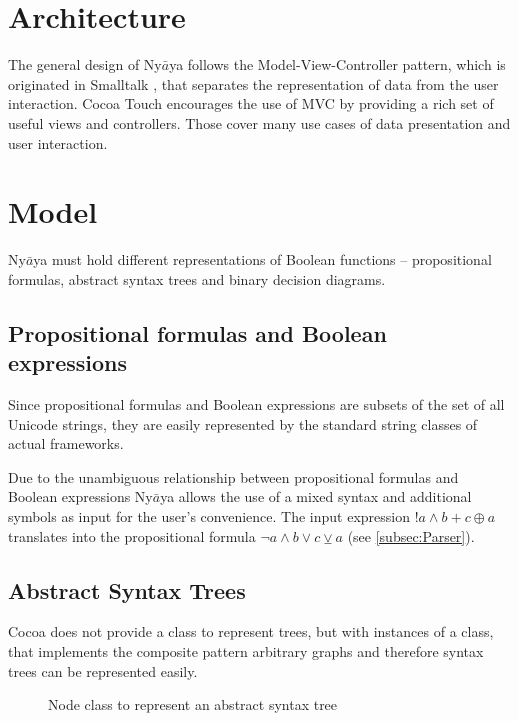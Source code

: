 
\section{Architecture}

The general design of Ny$\bar{a}$ya follows the Model-View-Controller pattern,
which is originated in Smalltalk \cite[p.4]{GAMMAETAL}, 
that separates the representation of data from the user interaction.
Cocoa Touch  encourages the use of MVC by providing a rich set of useful views and controllers.
Those cover many use cases of data presentation and user interaction.

\section{Model}

Ny$\bar{a}$ya must hold different representations of Boolean functions – propositional formulas, abstract syntax trees and binary decision diagrams. 

\subsection{Propositional formulas and Boolean expressions}
Since propositional formulas and Boolean expressions are subsets of the set of all Unicode strings,
they are easily represented by the standard string classes of actual frameworks. 

Due to the unambiguous relationship between propositional formulas and Boolean expressions 
Ny$\bar{a}$ya allows the use of a mixed syntax and additional symbols as input
for the user's convenience. The input expression $!a \wedge b + c \oplus a$ translates into the propositional formula
$\neg a \wedge b \vee c \veebar a$ (see \vref{subsec:Parser}).

\subsection{Abstract Syntax Trees}

Cocoa does not provide a class to represent trees, 
but with instances of a class, 
that implements the composite pattern \cite[p.163ff]{GAMMAETAL}
arbitrary graphs and therefore syntax trees can be represented easily.

\begin{figure}[htbp]
\begin{center}
\caption{Node class to represent an abstract syntax tree}
\label{fig:NyayaNodeCluster}
\end{center}
\end{figure}

